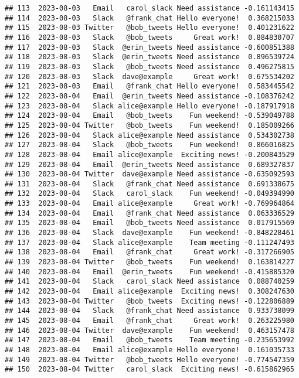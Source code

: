 \documentclass[
]{article}
\begin{document}
\begin{verbatim}
## 113  2023-08-03   Email   carol_slack Need assistance -0.161143415
## 114  2023-08-03   Slack   @frank_chat Hello everyone!  0.368215033
## 115  2023-08-03 Twitter   @bob_tweets Hello everyone!  0.401231622
## 116  2023-08-03   Slack   @bob_tweets     Great work!  0.884830707
## 117  2023-08-03   Slack  @erin_tweets Need assistance -0.600851388
## 118  2023-08-03   Slack  @erin_tweets Need assistance  0.896539724
## 119  2023-08-03   Slack   @bob_tweets Need assistance  0.496275815
## 120  2023-08-03   Slack  dave@example     Great work!  0.675534202
## 121  2023-08-03   Email   @frank_chat Hello everyone!  0.583445542
## 122  2023-08-04   Email  @erin_tweets Need assistance -0.108376242
## 123  2023-08-04   Slack alice@example Hello everyone! -0.187917918
## 124  2023-08-04   Email   @bob_tweets    Fun weekend! -0.539049788
## 125  2023-08-04 Twitter   @bob_tweets    Fun weekend!  0.185009266
## 126  2023-08-04   Slack alice@example Need assistance  0.534302738
## 127  2023-08-04   Slack   @bob_tweets    Fun weekend!  0.866016825
## 128  2023-08-04   Email alice@example  Exciting news! -0.200843529
## 129  2023-08-04   Email  @erin_tweets Need assistance  0.689327837
## 130  2023-08-04 Twitter  dave@example Need assistance -0.635092593
## 131  2023-08-04   Slack   @frank_chat Need assistance  0.691338675
## 132  2023-08-04   Slack   carol_slack    Fun weekend! -0.049394990
## 133  2023-08-04   Email alice@example     Great work! -0.769964864
## 134  2023-08-04   Email   @frank_chat Need assistance  0.063336529
## 135  2023-08-04   Email   @bob_tweets Need assistance  0.017915569
## 136  2023-08-04   Slack  dave@example    Fun weekend! -0.848228461
## 137  2023-08-04   Slack alice@example    Team meeting -0.111247493
## 138  2023-08-04   Email   @frank_chat     Great work! -0.317266905
## 139  2023-08-04 Twitter   @bob_tweets    Fun weekend!  0.163814227
## 140  2023-08-04   Email  @erin_tweets    Fun weekend! -0.415885320
## 141  2023-08-04   Slack   carol_slack Need assistance  0.088740259
## 142  2023-08-04   Email alice@example  Exciting news!  0.308247630
## 143  2023-08-04 Twitter   @bob_tweets  Exciting news! -0.122806889
## 144  2023-08-04   Slack   @frank_chat Need assistance  0.933738099
## 145  2023-08-04   Email   @frank_chat     Great work!  0.263225980
## 146  2023-08-04 Twitter  dave@example    Fun weekend!  0.463157478
## 147  2023-08-04   Email   @bob_tweets    Team meeting -0.235653992
## 148  2023-08-04   Email alice@example Hello everyone!  0.161035733
## 149  2023-08-04 Twitter   @bob_tweets Hello everyone! -0.774547359
## 150  2023-08-04 Twitter   carol_slack  Exciting news! -0.615862965

\end{verbatim}
\end{document}
